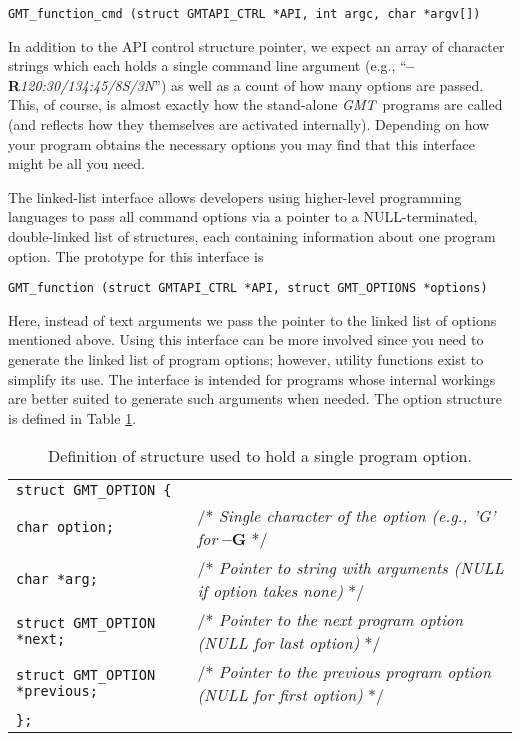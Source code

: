 \documentclass{report}
\newcommand{\GMT}{\textit{GMT}}%
\newcommand{\GMT}{\htmladdnormallink{\texttt{[image: eps/GMT\_glyph10.eps]}}{http://gmt.soest.hawaii.edu}}%
\newcommand{\Opt}[1]{{\bf --#1}}%
\newcommand{\GMT}{\htmladdnormallink{\textbf{GMT}}{http://gmt.soest.hawaii.edu}}%
\newcommand{\Opt}[1]{{\bf -#1}}%
\begin{document}
\begin{verbatim}
GMT_function_cmd (struct GMTAPI_CTRL *API, int argc, char *argv[])
\end{verbatim}
In addition to the API control structure pointer, we expect an array of character strings which each
holds a single command line argument (e.g., ``\Opt{R}{\it 120:30/134:45/8S/3N}'') as well as a count
of how many options are passed.  This, of course, is almost exactly how the stand-alone \GMT\
programs are called (and reflects how they themselves are activated internally).  Depending on how
your program obtains the necessary options you may find that this interface might be all
you need.

The linked-list interface allows developers using higher-level programming languages to pass all command
options via a pointer to a NULL-terminated, double-linked list of structures, each containing
information about one program option.  The prototype for this interface is

\begin{verbatim}
GMT_function (struct GMTAPI_CTRL *API, struct GMT_OPTIONS *options)
\end{verbatim}
Here, instead of text arguments we pass the pointer to the linked list of options mentioned above.  Using
this interface can be more involved since you need to generate the linked
list of program options; however, utility functions exist to simplify its use.
The interface is intended for programs whose internal workings are better suited to
generate such arguments when needed.  The option structure is defined in Table \ref{tbl:options}.
\begin{table}[h]
\small
\centering
\begin{tabular}{ll}
\multicolumn{2}{l}{\texttt{struct GMT\_OPTION \{}} \\
\texttt{char option;}			&       /* {\it Single character of the option (e.g., 'G' for} \Opt{G} */ \\
\texttt{char *arg;}			&       /* {\it Pointer to string with arguments (NULL if option takes none)} */ \\
\texttt{struct GMT\_OPTION *next;}	&       /* {\it Pointer to the next program option (NULL for last option)}  */\\ 
\texttt{struct GMT\_OPTION *previous;}	&       /* {\it Pointer to the previous program option (NULL for first option)}  */\\ 
\texttt{\};}	&        \\
\end{tabular}
\caption{Definition of structure used to hold a single program option.}
\label{tbl:options}
\end{table}
\end{document}
